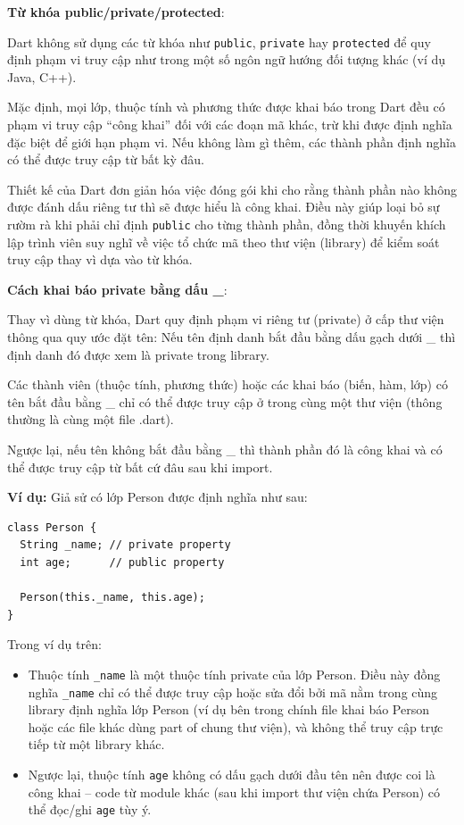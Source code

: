 \documentclass[../DoAn.tex]{subfiles}
\numberwithin{figure}{chapter}
\begin{document}
\textbf{Từ khóa public/private/protected}: 

Dart không sử dụng các từ khóa như \texttt{public}, \texttt{private} hay \texttt{protected} để quy định phạm vi truy cập như trong một số ngôn ngữ hướng đối tượng khác (ví dụ Java, C++). 

Mặc định, mọi lớp, thuộc tính và phương thức được khai báo trong Dart đều có phạm vi truy cập “công khai” đối với các đoạn mã khác, trừ khi được định nghĩa đặc biệt để giới hạn phạm vi. Nếu không làm gì thêm, các thành phần định nghĩa có thể được truy cập từ bất kỳ đâu. 

Thiết kế của Dart đơn giản hóa việc đóng gói khi cho rằng thành phần nào không được đánh dấu riêng tư thì sẽ được hiểu là công khai. Điều này giúp loại bỏ sự rườm rà khi phải chỉ định \texttt{public} cho từng thành phần, đồng thời khuyến khích lập trình viên suy nghĩ về việc tổ chức mã theo thư viện (library) để kiểm soát truy cập thay vì dựa vào từ khóa.

\textbf{Cách khai báo private bằng dấu {\textbf{\_}}}: 

Thay vì dùng từ khóa, Dart quy định phạm vi riêng tư (private) ở cấp thư viện thông qua quy ước đặt tên: Nếu tên định danh bắt đầu bằng dấu gạch dưới \_ thì định danh đó được xem là private trong library. 

Các thành viên (thuộc tính, phương thức) hoặc các khai báo (biến, hàm, lớp) có tên bắt đầu bằng \_ chỉ có thể được truy cập ở trong cùng một thư viện (thông thường là cùng một file .dart). 

Ngược lại, nếu tên không bắt đầu bằng \_ thì thành phần đó là công khai và có thể được truy cập từ bất cứ đâu sau khi import. 

\textbf{Ví dụ:} Giả sử có lớp Person được định nghĩa như sau: 
\begin{lstlisting}
class Person {
  String _name; // private property
  int age;      // public property

  Person(this._name, this.age);
}
\end{lstlisting}

Trong ví dụ trên: 
\begin{itemize}
    \item Thuộc tính {\texttt{\_name}} là một thuộc tính private của lớp Person. Điều này đồng nghĩa {\texttt{\_name}} chỉ có thể được truy cập hoặc sửa đổi bởi mã nằm trong cùng library định nghĩa lớp Person (ví dụ bên trong chính file khai báo Person hoặc các file khác dùng part of chung thư viện), và không thể truy cập trực tiếp từ một library khác. 
    \item Ngược lại, thuộc tính \texttt{age} không có dấu gạch dưới đầu tên nên được coi là công khai – code từ module khác (sau khi import thư viện chứa Person) có thể đọc/ghi \texttt{age} tùy ý.
\end{itemize}
\end{document}
